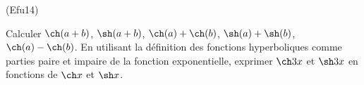 \begin{tiny}(Efu14)\end{tiny} Calculer $\ch(a+b)$, $\sh(a+b)$, $\ch(a)+\ch(b)$, $\sh(a)+\sh(b)$, $\ch(a)-\ch(b)$.\newline
En utilisant la définition des fonctions hyperboliques comme parties paire et impaire de la fonction exponentielle, exprimer $\ch 3x$ et $\sh 3x$ en fonctions de $\ch x$ et $\sh x$.